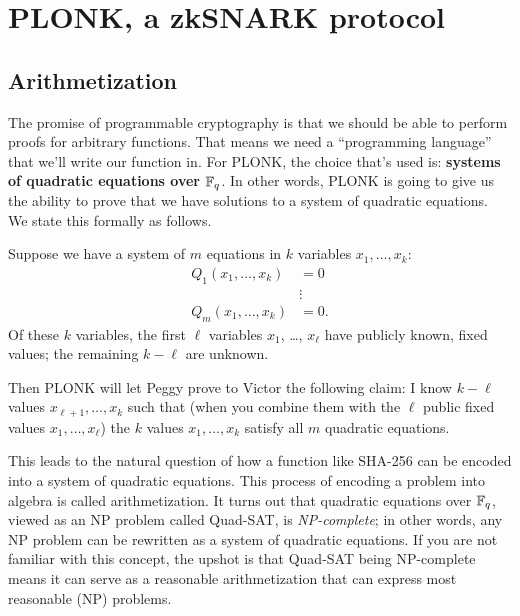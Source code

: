 \section{PLONK, a zkSNARK protocol}
\label{plonk}

\subsection{Arithmetization}
\label{arith-intro}

The promise of programmable cryptography is that we should be able to
perform proofs for arbitrary functions. That means we need a
``programming language'' that we'll write our function in. For PLONK,
the choice that's used is: \textbf{systems of quadratic equations over
$\mathbb{F}_{q}$}. In other words, PLONK is going to give us the
ability to prove that we have solutions to a system of quadratic
equations. We state this formally as follows.

\begin{goal}{}{}
  Suppose we have a system of $m$ equations in $k$ variables $x_{1},\ldots,x_{k}$:
  \begin{align*}
    Q_1( x_{1},\ldots,x_{k} ) & = 0 \\
    &\vdots \\
    Q_{m}( x_{1},\ldots,x_{k} ) & = 0.
  \end{align*}
  Of these $k$ variables, the first $\ell$ variables $x_{1}$, \dots, $x_{\ell}$
  have publicly known, fixed values; the remaining $k - \ell$ are unknown.

  Then PLONK will let Peggy prove to Victor the following claim:
  I know $k - \ell$ values $x_{\ell + 1},\ldots,x_{k}$ such that
  (when you combine them with the $\ell$ public fixed values $x_{1},\ldots,x_{\ell}$)
  the $k$ values $x_{1},\ldots,x_{k}$ satisfy all $m$ quadratic equations.
\end{goal}

This leads to the natural question of how a function like SHA-256 can be
encoded into a system of quadratic equations. This process of encoding a
problem into algebra is called \alert{arithmetization}. It turns out that
quadratic equations over $\mathbb{F}_{q}$, viewed as an NP problem
called Quad-SAT, is \emph{NP-complete}; in other words, any NP problem
can be rewritten as a system of quadratic equations. If you are not
familiar with this concept, the upshot is that Quad-SAT being
NP-complete means it can serve as a reasonable arithmetization that can
express most reasonable (NP) problems.

